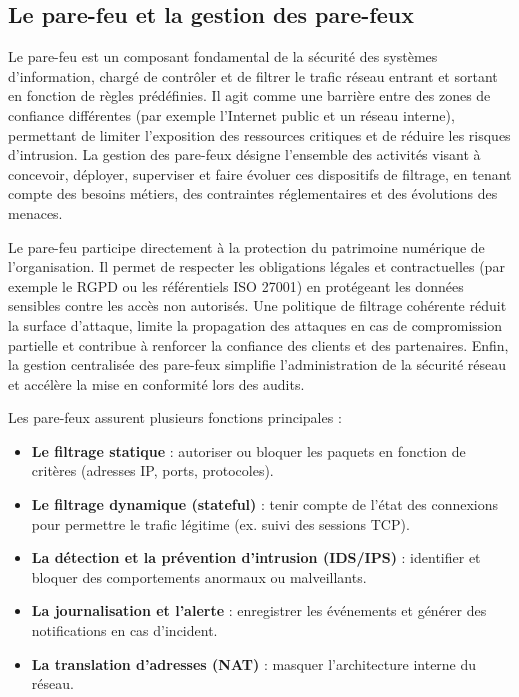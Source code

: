 \subsection{Le pare-feu et la gestion des pare-feux}

Le pare-feu est un composant fondamental de la sécurité des systèmes d’information, chargé de contrôler et de filtrer le trafic réseau entrant et sortant en fonction de règles prédéfinies. Il agit comme une barrière entre des zones de confiance différentes (par exemple l’Internet public et un réseau interne), permettant de limiter l’exposition des ressources critiques et de réduire les risques d’intrusion. La gestion des pare-feux désigne l’ensemble des activités visant à concevoir, déployer, superviser et faire évoluer ces dispositifs de filtrage, en tenant compte des besoins métiers, des contraintes réglementaires et des évolutions des menaces.

Le pare-feu participe directement à la protection du patrimoine numérique de l’organisation. Il permet de respecter les obligations légales et contractuelles (par exemple le RGPD ou les référentiels ISO 27001) en protégeant les données sensibles contre les accès non autorisés. Une politique de filtrage cohérente réduit la surface d’attaque, limite la propagation des attaques en cas de compromission partielle et contribue à renforcer la confiance des clients et des partenaires. Enfin, la gestion centralisée des pare-feux simplifie l’administration de la sécurité réseau et accélère la mise en conformité lors des audits.

Les pare-feux assurent plusieurs fonctions principales :
\begin{itemize}
	\item \textbf{Le filtrage statique}  : autoriser ou bloquer les paquets en fonction de critères (adresses IP, ports, protocoles).
	\item \textbf{Le filtrage dynamique (stateful)}  : tenir compte de l’état des connexions pour permettre le trafic légitime (ex. suivi des sessions TCP).
	\item \textbf{La détection et la prévention d’intrusion (IDS/IPS)}  : identifier et bloquer des comportements anormaux ou malveillants.
	\item \textbf{La journalisation et l’alerte}  : enregistrer les événements et générer des notifications en cas d’incident.
	\item \textbf{La translation d’adresses (NAT)}  : masquer l’architecture interne du réseau.
\end{itemize}

